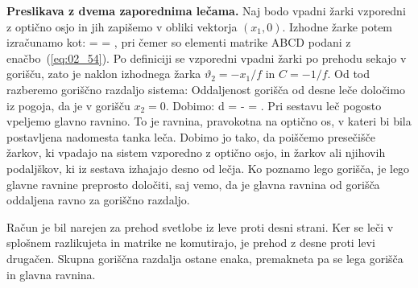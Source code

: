 \begin{example}{\bf Preslikava z dvema zaporednima lečama.}
Naj bodo vpadni žarki vzporedni z optično osjo in jih zapišemo 
v obliki vektorja $(x_1,0)$. Izhodne žarke potem izračunamo kot:
\beq
{}
 = 
\left[\begin{array}{cc}
1& d\\
0&1
\end{array}\right]
\cdot
\left[\begin{array}{cc}
A& B\\
C&D
\end{array}\right]\cdot 
\left[\begin{array}{c}
x_1\\
0
\end{array}\right] = 
\!\!,
\label{eq:02_55}
\eeq
pri čemer so elementi matrike ABCD podani z enačbo~(\ref{eq:02_54}). 
Po definiciji se vzporedni vpadni žarki po prehodu sekajo v gorišču, 
zato je naklon izhodnega žarka $\vartheta_2 = -x_1/f$ in $C = -1/f$. 
Od tod razberemo goriščno razdaljo sistema:
Oddaljenost gorišča od desne leče določimo iz pogoja, da je v gorišču $x_2 = 0$. Dobimo:
\beq
d = - = .
\label{eq:02_56}
\eeq
Pri sestavu leč pogosto vpeljemo glavno ravnino. To je ravnina, pravokotna
na optično os, v kateri bi 
bila postavljena nadomesta tanka leča. Dobimo jo tako, da poiščemo 
presečišče žarkov, ki vpadajo na sistem vzporedno z optično osjo, 
in žarkov ali njihovih podaljškov, ki iz sestava izhajajo desno od lečja. 
Ko poznamo lego gorišča, je lego glavne ravnine preprosto določiti, 
saj vemo, da je glavna ravnina od gorišča oddaljena ravno za goriščno razdaljo.

Račun je bil narejen za prehod svetlobe iz
leve proti desni strani. Ker se leči v splošnem razlikujeta in matrike
ne komutirajo, je prehod z desne proti levi drugačen. Skupna goriščna
razdalja ostane enaka, premakneta pa se lega gorišča in glavna ravnina.
\end{example}

